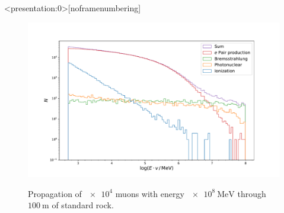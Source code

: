 \documentclass[aspectratio=1610, captions=tableheading, 11pt]{beamer}
\begin{document}
\begin{frame}<presentation:0>[noframenumbering]
\begin{figure}
  \begin{minipage}[c]{0.7\textwidth}
    \includegraphics[width=\textwidth , trim=1.9cm 0.5cm 1.9cm 2cm,clip=true]{plots/standard.pdf}
  \end{minipage}\hfill
  \begin{minipage}[c]{0.3\textwidth}
    Propagation of $\num{e4}$ muons with energy $\SI{e8}{\mega\electronvolt}$ through $\SI{100}{\metre}$ of standard rock.
     \label{fig:03-03}
  \end{minipage}
\end{figure}

\end{frame}

\end{document}
